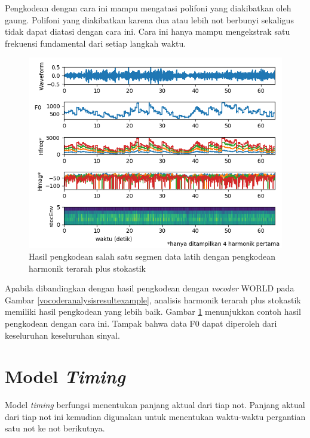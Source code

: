 Pengkodean dengan cara ini mampu mengatasi polifoni yang diakibatkan oleh gaung. Polifoni yang diakibatkan karena dua atau lebih not berbunyi sekaligus tidak dapat diatasi dengan cara ini. Cara ini hanya mampu mengekstrak satu frekuensi fundamental dari setiap langkah waktu.

\begin{figure}[h]
    \centering
    \includegraphics[width=\textwidth]{resources/Analisis_guidedtwmhps.png}
    \caption{Hasil pengkodean salah satu segmen data latih dengan pengkodean harmonik terarah plus stokastik} \label{guidedtwmhpsanalysisresultexample}
\end{figure}

Apabila dibandingkan dengan hasil pengkodean dengan \textit{vocoder} WORLD pada Gambar \ref{vocoderanalysisresultexample}, analisis harmonik terarah plus stokastik memiliki hasil pengkodean yang lebih baik. Gambar \ref{guidedtwmhpsanalysisresultexample} menunjukkan contoh hasil pengkodean dengan cara ini. Tampak bahwa data F0 dapat diperoleh dari keseluruhan keseluruhan sinyal.

\section{Model \textit{Timing}}

Model \textit{timing} berfungsi menentukan panjang aktual dari tiap not. Panjang aktual dari tiap not ini kemudian digunakan untuk menentukan waktu-waktu pergantian satu not ke not berikutnya.

